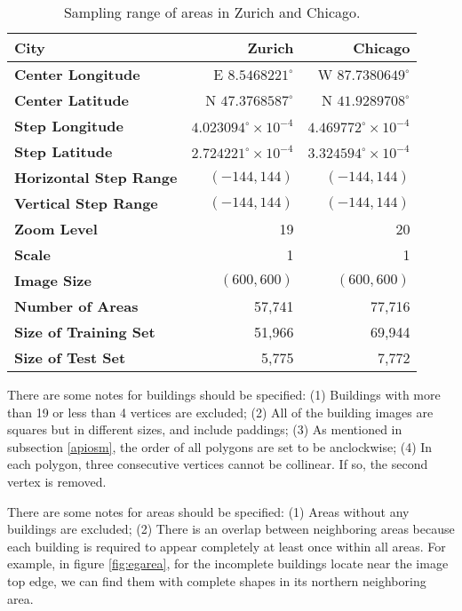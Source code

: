\begin{table}[!h]
	\centering
	\caption[Sampling range of areas in Zurich and Chicago]{Sampling range of areas in Zurich and Chicago.}
	\label{tab:arerange}
	\begin{tabular}{l|r|r}
	\hline
	\textbf{City} & Zurich & Chicago \\ \hline
	\textbf{Center Longitude }& E $8.5468221^\circ$ & W $87.7380649^\circ$ \\
	\textbf{Center Latitude} & N $47.3768587^\circ$ & N $41.9289708^\circ$ \\
	\textbf{Step Longitude} & $4.023094^\circ\times10^{-4}$ & $4.469772^\circ\times10^{-4}$ \\
	\textbf{Step Latitude} & $2.724221^\circ\times10^{-4}$ & $3.324594^\circ\times10^{-4}$ \\
	\textbf{Horizontal Step Range} & $(-144, 144)$ & $(-144, 144)$ \\
	\textbf{Vertical Step Range} & $(-144, 144)$ & $(-144, 144)$ \\
	\textbf{Zoom Level} & 19 & 20 \\
	\textbf{Scale} & 1 & 1 \\
	\textbf{Image Size} & $(600, 600)$ & $(600, 600)$ \\
	\hline
	\textbf{Number of Areas} & 57,741 & 77,716 \\
	\textbf{Size of Training Set} & 51,966 & 69,944 \\
	\textbf{Size of Test Set} & 5,775 & 7,772 \\
	\hline
	\end{tabular}
\end{table}

There are some notes for buildings should be specified: (1) Buildings with more than 19 or less than 4 vertices are excluded; (2) All of the building images are squares but in different sizes, and include paddings; (3) As mentioned in subsection \ref{apiosm}, the order of all polygons are set to be anclockwise; (4) In each polygon, three consecutive vertices cannot be collinear. If so, the second vertex is removed.

There are some notes for areas should be specified: (1) Areas without any buildings are excluded; (2) There is an overlap between neighboring areas because each building is required to appear completely at least once within all areas. For example, in figure \ref{fig:egarea}, for the incomplete buildings locate near the image top edge, we can find them with complete shapes in its northern neighboring area.

